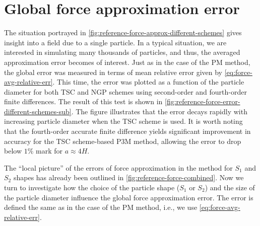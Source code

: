 \section{Global force approximation error}
The situation portrayed in \autoref{fig:reference-force-approx-different-schemes} gives insight into a field due to a single particle.
In a typical situation, we are interested in simulating many thousands of particles, and thus, the averaged approximation error becomes of interest.
Just as in the case of the PM method, the global error was measured in terms of mean relative error given by \autoref{eq:force-avg-relative-err}.
This time, the error was plotted as a function of the particle diameter for both TSC and NGP schemes using second-order and fourth-order finite differences.
The result of this test is shown in \autoref{fig:reference-force-error-different-schemes-sub}.
The figure illustrates that the error decays rapidly with increasing particle diameter when the TSC scheme is used.
It is worth noting that the fourth-order accurate finite difference yields significant improvement in accuracy for the TSC scheme-based P3M method, allowing the error to drop below $1\%$ mark for $a \approx 4H$.

The ``local picture'' of the errors of force approximation in the \PThreeM{} method for $S_1$ and $S_2$ shapes has already been outlined in \autoref{fig:reference-force-combined}.
Now we turn to investigate how the choice of the particle shape ($S_1$ or $S_2$) and the size of the particle diameter influence the global force approximation error.
The error is defined the same as in the case of the PM method, i.e., we use \autoref{eq:force-avg-relative-err}.

